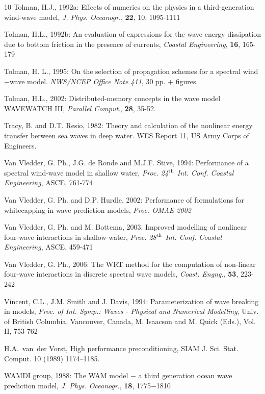 \documentclass[12pt]{book}
\begin{document}
\begin{thebibliography}{10}
Tolman, H.J., 1992a: Effects of numerics on the physics in a third-generation wind-wave model, {\it J. Phys.
Oceanogr}., {\bf 22}, 10, 1095-1111

Tolman, H.L., 1992b: An evaluation of expressions for the wave energy dissipation due to bottom friction
in the presence of currents, {\it Coastal Engineering}, {\bf 16}, 165-179

Tolman, H. L., 1995: On the selection of propagation schemes for a spectral wind$-$wave model.
{\it NWS/NCEP Office Note 411}, 30 pp. + figures.

Tolman, H.L., 2002: Distributed-memory concepts in the wave model {WAVEWATCH III},
{\it Parallel Comput}., {\bf 28}, 35-52.

Tracy, B. and D.T. Resio, 1982: Theory and calculation of the nonlinear energy transfer between
sea waves in deep water. WES Report 11, US Army Corps of Engineers.

Van Vledder, G. Ph., J.G. de Ronde and M.J.F. Stive, 1994: Performance of a spectral wind-wave model
in shallow water, {\it Proc. 24$^{{\rm th}}$ Int. Conf. Coastal Engineering}, ASCE, 761-774

Van Vledder, G. Ph. and D.P. Hurdle, 2002: Performance of formulations for whitecapping in wave
prediction models, {\it Proc. OMAE 2002}

Van Vledder, G. Ph. and M. Bottema, 2003: Improved modelling of nonlinear four-wave interactions
in shallow water, {\it Proc. 28$^{{\rm th}}$ Int. Conf. Coastal Engineering}, ASCE, 459-471

Van Vledder, G. Ph., 2006: The {WRT} method for the computation of non-linear four-wave interactions in
discrete spectral wave models, {\it Coast. Engng.}, {\bf 53}, 223-242

Vincent, C.L., J.M. Smith and J. Davis, 1994: Parameterization of wave breaking in  models, {\it Proc. of Int.
Symp.: Waves - Physical and Numerical Modelling}, Univ. of British Columbia, Vancouver,
Canada, M. Isaacson and M. Quick (Eds.), Vol. II, 753-762

H.A.~van~der Vorst, High performance preconditioning, SIAM J. Sci. Stat. Comput.
  10 (1989) 1174--1185.

WAMDI group, 1988: The WAM model $-$ a third generation ocean wave prediction model, {\it J. Phys.
Oceanogr}., {\bf 18}, 1775$-$1810


\end{thebibliography}
\end{document}
